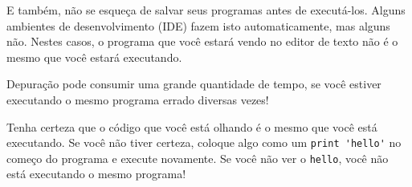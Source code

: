 E também, não se esqueça de salvar seus programas antes de executá-los.
Alguns ambientes de desenvolvimento (IDE) fazem isto automaticamente, mas
alguns não. Nestes casos, o programa que você estará vendo no editor de texto
não é o mesmo que você estará executando.


Depuração pode consumir uma grande quantidade de tempo, se você estiver
executando o mesmo programa errado diversas vezes!


Tenha certeza que o código que você está olhando é o mesmo que você está
executando. Se você não tiver certeza, coloque algo como um \verb"print 'hello'"
no começo do programa e execute novamente. Se você não ver o \verb"hello",
você não está executando o mesmo programa!



